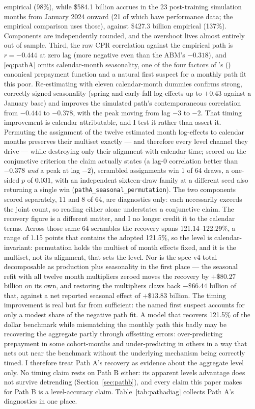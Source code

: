 \documentclass[12pt]{article}
\newcommand{\citepos}[1]{\citeauthor{#1}'s (\citeyear{#1})}
\begin{document}
empirical (98\%), while \$584.1 billion accrues in the 23 post-training simulation months from January 2024 onward (21 of which have performance data; the empirical comparison uses those), against \$427.3 billion empirical (137\%). Components are independently rounded, and the overshoot lives almost entirely out of sample. Third, the raw CPR correlation against the empirical path is $r = -0.444$ at zero lag (more negative even than the ABM's $-0.318$), and \eqref{eq:pathA} omits calendar-month seasonality, one of the four factors of \citepos{richard1989} canonical prepayment function and a natural first suspect for a monthly path fit this poor. Re-estimating with eleven calendar-month dummies confirms strong, correctly signed seasonality (spring and early-fall log-effects up to $+0.43$ against a January base) and improves the simulated path's contemporaneous correlation from $-0.444$ to $-0.378$, with the peak moving from lag $-3$ to $-2$. That timing improvement is calendar-attributable, and I test it rather than assert it. Permuting the assignment of the twelve estimated month log-effects to calendar months preserves their multiset exactly --- and therefore every level channel they drive --- while destroying only their alignment with calendar time; scored on the conjunctive criterion the claim actually states (a lag-0 correlation better than $-0.378$ \emph{and} a peak at lag $-2$), scrambled assignments win 1 of 64 draws, a one-sided $p$ of 0.031, with an independent sixteen-draw family at a different seed also returning a single win (\texttt{pathA\_seasonal\_permutation}). The two components scored separately, 11 and 8 of 64, are diagnostics only: each necessarily exceeds the joint count, so reading either alone understates a conjunctive claim. The recovery figure is a different matter, and I no longer credit it to the calendar terms. Across those same 64 scrambles the recovery spans 121.14--122.29\%, a range of 1.15 points that contains the adopted 121.5\%, so the level is calendar-invariant: permutation holds the multiset of month effects fixed, and it is the multiset, not its alignment, that sets the level. Nor is the spec-v4 total decomposable as production plus seasonality in the first place --- the seasonal refit with all twelve month multipliers zeroed moves the recovery by $+\$80.27$ billion on its own, and restoring the multipliers claws back $-\$66.44$ billion of that, against a net reported seasonal effect of $+\$13.83$ billion. The timing improvement is real but far from sufficient: the named first suspect accounts for only a modest share of the negative path fit. A model that recovers 121.5\% of the dollar benchmark while mismatching the monthly path this badly may be recovering the aggregate partly through offsetting errors: over-predicting prepayment in some cohort-months and under-predicting in others in a way that nets out near the benchmark without the underlying mechanism being correctly timed. I therefore treat Path A's recovery as evidence about the aggregate level only. No timing claim rests on Path B either: its apparent levels advantage does not survive detrending (Section~\ref{sec:pathb}), and every claim this paper makes for Path B is a level-accuracy claim. Table~\ref{tab:pathadiag} collects Path A's diagnostics in one place.
\end{document}
